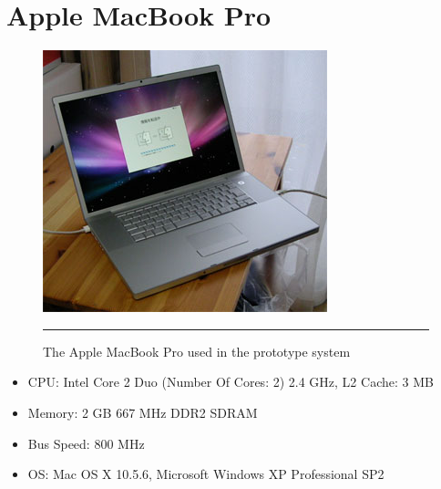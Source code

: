 \chapter{Apple MacBook Pro}
\label{AppendixMacBook}

\begin{figure}[htbp]
  \centering
    \includegraphics{./Primitives/macbookpro.jpg}
    \rule{35em}{0.5pt}
  \caption[Apple MacBook Pro]{The Apple MacBook Pro used in the prototype system}
\end{figure}

\begin{itemize}
	\item CPU: Intel Core 2 Duo (Number Of Cores: 2) 2.4 GHz, L2 Cache: 3 MB
	\item Memory: 2 GB 667 MHz DDR2 SDRAM
	\item Bus Speed: 800 MHz
	\item OS: Mac OS X 10.5.6, Microsoft Windows XP Professional SP2
\end{itemize}
